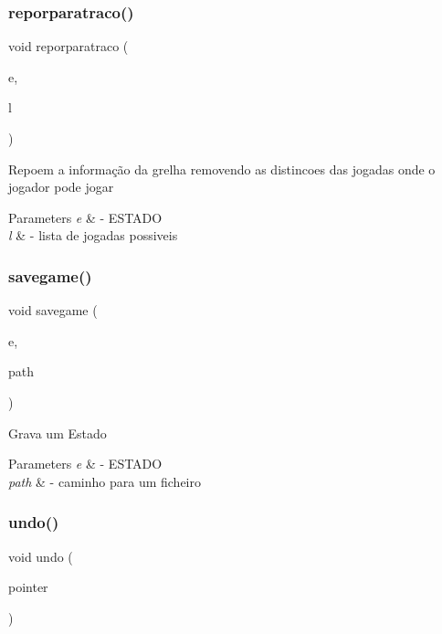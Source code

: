 \subsubsection{reporparatraco()}
{\footnotesize\ttfamily void reporparatraco (\begin{DoxyParamCaption}\item[{\textbf{ E\+S\+T\+A\+DO} $\ast$}]{e,  }\item[{\textbf{ Ltpl}}]{l }\end{DoxyParamCaption})}

Repoem a informação da grelha removendo as distincoes das jogadas onde o jogador pode jogar 
\begin{DoxyParams}{Parameters}
{\em e} & -\/ E\+S\+T\+A\+DO \\
\hline
{\em l} & -\/ lista de jogadas possiveis \\
\hline
\end{DoxyParams}
\mbox{\label{functions_8h_a1d2d86ab8a461942725cf959abd7378b}} 
\subsubsection{savegame()}
{\footnotesize\ttfamily void savegame (\begin{DoxyParamCaption}\item[{\textbf{ E\+S\+T\+A\+DO} $\ast$}]{e,  }\item[{char $\ast$}]{path }\end{DoxyParamCaption})}

Grava um Estado 
\begin{DoxyParams}{Parameters}
{\em e} & -\/ E\+S\+T\+A\+DO \\
\hline
{\em path} & -\/ caminho para um ficheiro \\
\hline
\end{DoxyParams}
\mbox{\label{functions_8h_a6e98f72a1106d64e70d4a5659bd8f990}} 
\subsubsection{undo()}
{\footnotesize\ttfamily void undo (\begin{DoxyParamCaption}\item[{\textbf{ S\+T\+A\+CK} $\ast$}]{pointer }\end{DoxyParamCaption})}

